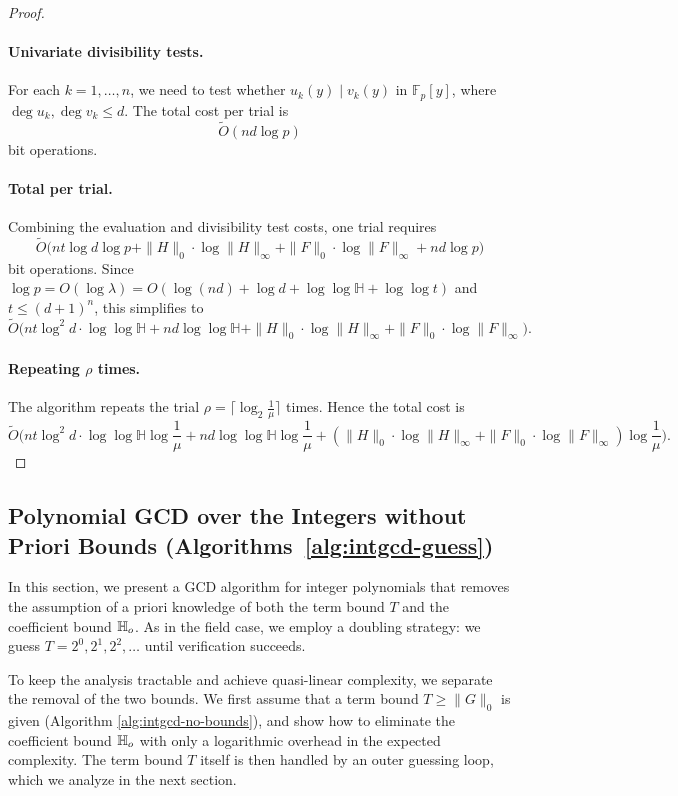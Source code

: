 \documentclass{article}
\numberwithin{equation}{section}
\begin{document}
\begin{proof}
\paragraph{Univariate divisibility tests.}
For each $k=1,\dots,n$, we need to test whether $u_k(y) \mid v_k(y)$ in $\mathbb{F}_p[y]$, where $\deg u_k, \deg v_k \le d$. The total cost per trial is
\[
\widetilde{O}(n d \log p)
\]
bit operations.

\paragraph{Total per trial.}
Combining the evaluation and divisibility test costs, one trial requires
\[
\widetilde{O}\bigl( n t \log d \log p + \|H\|_0\cdot \log\|H\|_{\infty}+ \|F\|_0\cdot \log \|F\|_{\infty}  + n d \log p \bigr)
\]
bit operations. Since $\log p = O(\log \lambda) = O(\log(nd) + \log d + \log\log \mathbb{H} + \log\log t)$ and $t \le (d+1)^n$, this simplifies to
\[
\widetilde{O}\bigl( n t \log^2 d \cdot \log\log \mathbb{H} + n d \log\log \mathbb{H} + \|H\|_0\cdot \log\|H\|_{\infty}+ \|F\|_0\cdot \log \|F\|_{\infty}\bigr).
\]

\paragraph{Repeating $\rho$ times.}
The algorithm repeats the trial $\rho = \lceil \log_2\frac{1}{\mu} \rceil$ times. Hence the total cost is
\[
\widetilde{O}\bigl( n t \log^2 d \cdot \log\log \mathbb{H} \log\frac{1}{\mu} + n d \log\log \mathbb{H} \log\frac{1}{\mu}+(\|H\|_0\cdot \log\|H\|_{\infty}+ \|F\|_0\cdot \log \|F\|_{\infty})\log\frac{1}{\mu} \bigr).
\]


\end{proof}


\subsection{Polynomial GCD over the Integers without Priori Bounds (Algorithms~\ref{alg:intgcd-guess})}
\label{sec:int-no-bounds}

In this section, we present a GCD algorithm for integer polynomials that removes the assumption of a priori knowledge of both the term bound $T$ and the coefficient bound $\mathbb{H}_{o}$. As in the field case, we employ a doubling strategy: we guess $T = 2^0, 2^1, 2^2, \dots$ until verification succeeds. 

To keep the analysis tractable and achieve quasi-linear complexity, we separate the removal of the two bounds. We first assume that a term bound $T \ge \|G\|_0$ is given (Algorithm \ref{alg:intgcd-no-bounds}), and show how to eliminate the coefficient bound $\mathbb{H}_{o}$ with only a logarithmic overhead in the expected complexity. The term bound $T$ itself is then handled by an outer guessing loop, which we analyze in the next section.
\end{document}
